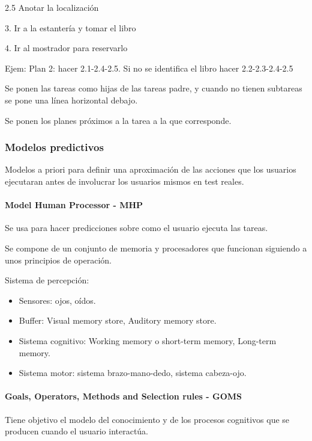 \documentclass[12pt, twoside, openright]{report} %
\begin{document}
\hspace{.6cm} 2.5 Anotar la localización

3. Ir a la estantería y tomar el libro

4. Ir al mostrador para reservarlo

Ejem: Plan 2: hacer 2.1-2.4-2.5. Si no se identifica el
libro hacer 2.2-2.3-2.4-2.5

\begin{figure}[H]
	{\def\svgwidth{.8\textwidth}
     }
\end{figure}
Se ponen las tareas como hijas de las tareas padre, y cuando no
tienen subtareas se pone una línea horizontal debajo.

Se ponen los planes próximos a la tarea a la que corresponde.

\subsubsection{Modelos predictivos}
Modelos a priori para definir una
aproximación de las acciones que los usuarios ejecutaran antes de
involucrar los usuarios mismos en test reales.

\paragraph{Model Human Processor - MHP}
Se usa para hacer predicciones
sobre como el usuario ejecuta las tareas.


Se compone de un conjunto de memoria y procesadores que
funcionan siguiendo a unos principios de operación.

Sistema de percepción:

\begin{itemize}
	\item Sensores: ojos, oídos.
	\item Buffer: Visual memory store, Auditory memory store.
	\item Sistema cognitivo: Working memory o short-term memory,
	      Long-term memory.
	\item Sistema motor: sistema brazo-mano-dedo, sistema cabeza-ojo.
\end{itemize}
\pagebreak

\paragraph{Goals, Operators, Methods and Selection rules - GOMS}
Tiene objetivo el modelo del conocimiento y de los procesos cognitivos
que se producen cuando el usuario interactúa.
\end{document}
